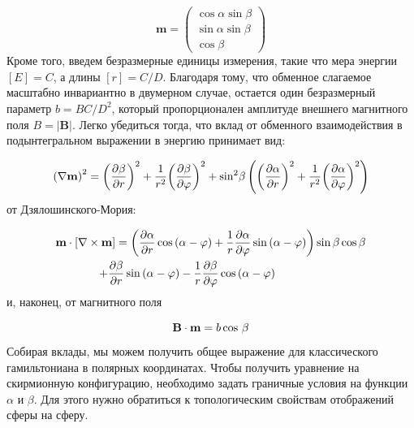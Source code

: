 \documentclass[a4paper,article,14pt]{extarticle}
\begin{document}
\begin{equation}
\label{eq:parametr}
{\mathbf{m}} = \left( {\begin{array}{*{20}{c}}
{\cos \alpha \sin \beta }\\
{\sin \alpha \sin \beta }\\
{\cos \beta }
\end{array}} \right)
\end{equation}
Кроме того, введем безразмерные единицы измерения, такие что мера энергии $[E]=C$, а длины $[r]=C/D$. Благодаря тому, что обменное слагаемое масштабно инвариантно в двумерном случае, остается один безразмерный параметр $b=BC/D^2$, который пропорционален амплитуде внешнего магнитного поля $B=|\mathbf{B}|$. Легко убедиться тогда, что вклад от обменного взаимодействия в подынтегральном выражении в энергию принимает вид:

\begin{equation}
\label{eq:ExchClass}
 {\left( {\nabla {\bf{m}}} \right)^2} = {\left( {\frac{{\partial \beta }}{{\partial r}}} \right)^2} + \frac{1}{{{r^2}}}{\left( {\frac{{\partial \beta }}{{\partial \varphi }}} \right)^2} + {\sin ^2}\beta \left( {{{\left( {\frac{{\partial \alpha }}{{\partial r}}} \right)}^2} + \frac{1}{{{r^2}}}{{\left( {\frac{{\partial \alpha }}{{\partial \varphi }}} \right)}^2}} \right)
\end{equation}
от Дзялошинского-Мория:

\begin{equation}
\label{eq:DMclass}
\begin{gathered}
  {\mathbf{m}} \cdot \left[ {\nabla  \times {\mathbf{m}}} \right] = \left( {\frac{{\partial \alpha }}{{\partial r}}\cos \left( {\alpha  - \varphi } \right) + \frac{1}{r}\frac{{\partial \alpha }}{{\partial \varphi }}\sin \left( {\alpha  - \varphi } \right)} \right)\sin \beta \cos \beta  \hfill \\
  \,\,\,\,\,\,\,\,\,\,\,\,\,\,\,\,\,\,\,\,\,\,\, + \frac{{\partial \beta }}{{\partial r}}\sin \left( {\alpha  - \varphi } \right) - \frac{1}{r}\frac{{\partial \beta }}{{\partial \varphi }}\cos \left( {\alpha  - \varphi } \right) \hfill \\ 
\end{gathered}
\end{equation}
и, наконец, от магнитного поля

\begin{equation}
\label{eq:ExtClass}
{\mathbf{B}} \cdot {\bf{m}} =  b\cos \, \beta 
\end{equation}
Собирая вклады, мы можем получить общее выражение для классического гамильтониана в полярных координатах. Чтобы получить уравнение на скирмионную конфигурацию, необходимо задать граничные условия на функции $\alpha$ и $\beta$. Для этого нужно обратиться к топологическим свойствам отображений сферы на сферу.
\end{document}
